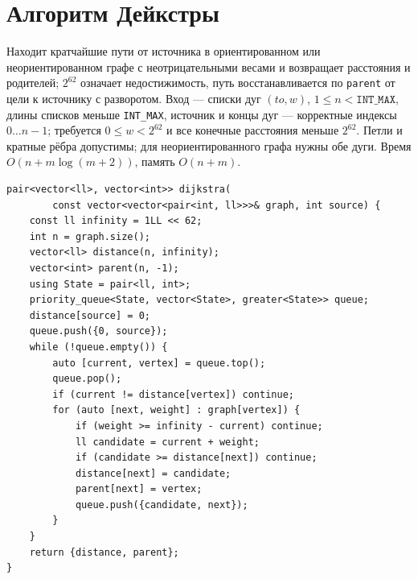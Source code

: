 \section{Алгоритм Дейкстры}
Находит кратчайшие пути от источника в ориентированном или неориентированном графе с неотрицательными весами и возвращает расстояния и родителей; $2^{62}$ означает недостижимость, путь восстанавливается по \texttt{parent} от цели к источнику с разворотом.
Вход --- списки дуг $(to,w)$, $1\le n<\texttt{INT\_MAX}$, длины списков меньше \texttt{INT\_MAX}, источник и концы дуг --- корректные индексы $0\ldots n-1$; требуется $0\le w<2^{62}$ и все конечные расстояния меньше $2^{62}$.
Петли и кратные рёбра допустимы; для неориентированного графа нужны обе дуги.
Время $O(n+m\log(m+2))$, память $O(n+m)$.
\begin{lstlisting}[name=graphs_dijkstra]
pair<vector<ll>, vector<int>> dijkstra(
        const vector<vector<pair<int, ll>>>& graph, int source) {
    const ll infinity = 1LL << 62;
    int n = graph.size();
    vector<ll> distance(n, infinity);
    vector<int> parent(n, -1);
    using State = pair<ll, int>;
    priority_queue<State, vector<State>, greater<State>> queue;
    distance[source] = 0;
    queue.push({0, source});
    while (!queue.empty()) {
        auto [current, vertex] = queue.top();
        queue.pop();
        if (current != distance[vertex]) continue;
        for (auto [next, weight] : graph[vertex]) {
            if (weight >= infinity - current) continue;
            ll candidate = current + weight;
            if (candidate >= distance[next]) continue;
            distance[next] = candidate;
            parent[next] = vertex;
            queue.push({candidate, next});
        }
    }
    return {distance, parent};
}
\end{lstlisting}
